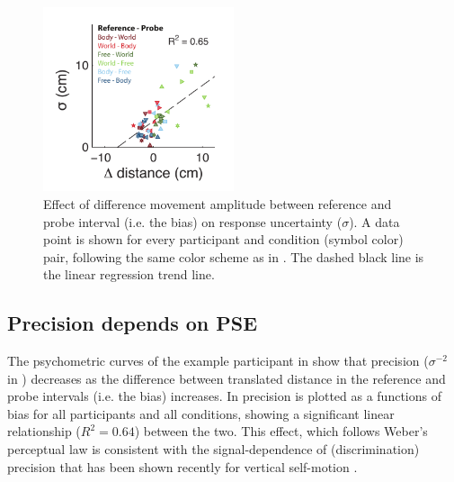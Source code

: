 \begin{figure}
    \includegraphics[width=0.5\textwidth]{src/paper3/figure5.pdf}

    \caption{Effect of difference movement amplitude between reference and probe interval (i.e. the bias) on response uncertainty ($\sigma$). A data point is shown for every participant and condition (symbol color) pair, following the same color scheme as in . The dashed black line is the linear regression trend line.}
    
    \label{p3:fig5}
\end{figure}

\subsection{Precision depends on PSE}
\label{p3:sec:precision}

The psychometric curves of the example participant in  show that precision ($\sigma^{-2}$ in ) decreases as the difference between translated distance in the reference and probe intervals (i.e. the bias) increases. In  precision is plotted as a functions of bias for all participants and all conditions, showing a significant linear relationship ($R^2 = 0.64$) between the two. This effect, which follows Weber's perceptual law \cite{fechner1860} is consistent with the signal-dependence of (discrimination) precision that has been shown recently for vertical self-motion \cite{nesti2014}.

